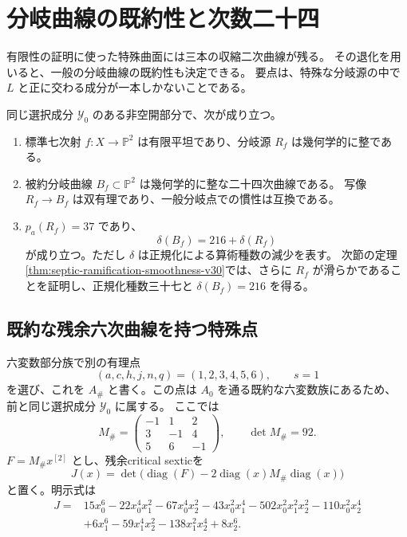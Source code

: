 \section{分岐曲線の既約性と次数二十四}
\label{sec:septic-branch-integrality-v30}

有限性の証明に使った特殊曲面には三本の収縮二次曲線が残る。
その退化を用いると、一般の分岐曲線の既約性も決定できる。
要点は、特殊な分岐源の中で $L$ と正に交わる成分が一本しかないことである。

\begin{theorem}[一般の分岐曲線]
\label{thm:septic-branch-integrality-v30}
同じ選択成分 $\mathcal Y_0$ のある非空開部分で、次が成り立つ。
\begin{enumerate}
\item 標準七次射 $f:X\to\mathbb P^2$ は有限平坦であり、分岐源 $R_f$ は幾何学的に整である。
\item 被約分岐曲線 $B_f\subset\mathbb P^2$ は幾何学的に整な二十四次曲線である。
写像 $R_f\to B_f$ は双有理であり、一般分岐点での慣性は互換である。
\item $p_a(R_f)=37$ であり、
\[
 \delta(B_f)=216+\delta(R_f)
\]
が成り立つ。ただし $\delta$ は正規化による算術種数の減少を表す。
次節の定理\ref{thm:septic-ramification-smoothness-v30}では、さらに
$R_f$ が滑らかであることを証明し、正規化種数三十七と $\delta(B_f)=216$ を得る。
\end{enumerate}
\end{theorem}

\subsection{既約な残余六次曲線を持つ特殊点}

六変数部分族で別の有理点
\[
 (a,c,h,j,n,q)=(1,2,3,4,5,6),\qquad s=1
\]
を選び、これを $A_\#$ と書く。この点は $A_0$ を通る既約な六変数族にあるため、
前と同じ選択成分 $\mathcal Y_0$ に属する。
ここでは
\[
 M_\#=\begin{pmatrix}-1&1&2\\3&-1&4\\5&6&-1\end{pmatrix},\qquad
 \det M_\#=92.
\]
$F=M_\#x^{[2]}$ とし、残余critical sexticを
\[
 J(x)=\det\bigl(\operatorname{diag}(F)-2\operatorname{diag}(x)M_\#\operatorname{diag}(x)\bigr)
\]
と置く。明示式は
\begin{align*}
 J={}&15x_0^6-22x_0^4x_1^2-67x_0^4x_2^2-43x_0^2x_1^4
      -502x_0^2x_1^2x_2^2-110x_0^2x_2^4\\
     &+6x_1^6-59x_1^4x_2^2-138x_1^2x_2^4+8x_2^6.
\end{align*}

